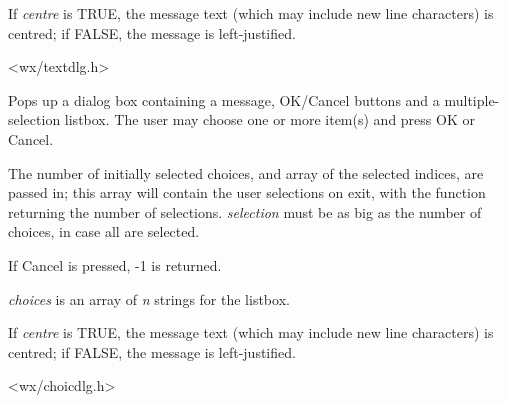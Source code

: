 If {\it centre} is TRUE, the message text (which may include new line characters)
is centred; if FALSE, the message is left-justified.


<wx/textdlg.h>

\label{wxgetmultiplechoice}


Pops up a dialog box containing a message, OK/Cancel buttons and a multiple-selection
listbox. The user may choose one or more item(s) and press OK or Cancel.

The number of initially selected choices, and array of the selected indices,
are passed in; this array will contain the user selections on exit, with
the function returning the number of selections. {\it selection} must be
as big as the number of choices, in case all are selected.

If Cancel is pressed, -1 is returned.

{\it choices} is an array of {\it n} strings for the listbox.

If {\it centre} is TRUE, the message text (which may include new line characters)
is centred; if FALSE, the message is left-justified.


<wx/choicdlg.h>

\label{wxgetsinglechoice}


